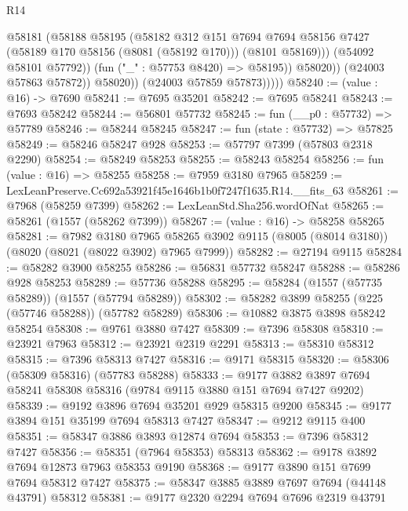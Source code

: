 \begin{lexlean}{R14}
\begin{coremodule}
                        @58181
                          (@58188
                            @58195
                            (@58182
                              @312
                              @151
                              @7694
                              @7694
                              @58156
                              @7427
                              (@58189 @170 @58156 (@8081 (@58192 @170)))
                              (@8101 @58169)))
                          (@54092 @58101 @57792))
                        (fun ("_" : @57753 @8420) => @58195))
                      @58020))
                  (@24003 @57863 @57872))
                @58020))
            (@24003 @57859 @57873)))))
@58240 := (value : @16) -> @7690
@58241 := @7695 @35201
@58242 := @7695 @58241
@58243 := @7693 @58242
@58244 := @56801 @57732
@58245 := fun (__p0 : @57732) => @57789
@58246 := @58244 @58245
@58247 := fun (state : @57732) => @57825
@58249 := @58246 @58247 @928
@58253 := @57797 @7399 (@57803 @2318 @2290)
@58254 := @58249 @58253
@58255 := @58243 @58254
@58256 := fun (value : @16) => @58255
@58258 := @7959 @3180 @7965
@58259 := LexLeanPreserve.Cc692a53921f45e1646b1b0f7247f1635.R14.__fits_63
@58261 := @7968 (@58259 @7399)
@58262 := LexLeanStd.Sha256.wordOfNat
@58265 := @58261 (@1557 (@58262 @7399))
@58267 := (value : @16) -> @58258 @58265
@58281 := @7982
    @3180
    @7965
    @58265
    @3902
    @9115
    (@8005 (@8014 @3180))
    (@8020 (@8021 (@8022 @3902) @7965 @7999))
@58282 := @27194 @9115
@58284 := @58282 @3900 @58255
@58286 := @56831 @57732 @58247
@58288 := @58286 @928 @58253
@58289 := @57736 @58288
@58295 := @58284 (@1557 (@57735 @58289)) (@1557 (@57794 @58289))
@58302 := @58282 @3899 @58255 (@225 (@57746 @58288)) (@57782 @58289)
@58306 := @10882 @3875 @3898 @58242 @58254
@58308 := @9761 @3880 @7427
@58309 := @7396 @58308
@58310 := @23921 @7963
@58312 := @23921 @2319 @2291
@58313 := @58310 @58312
@58315 := @7396 @58313 @7427
@58316 := @9171 @58315
@58320 := @58306 (@58309 @58316) (@57783 @58288)
@58333 := @9177 @3882 @3897 @7694 @58241 @58308 @58316 (@9784 @9115 @3880 @151 @7694 @7427 @9202)
@58339 := @9192 @3896 @7694 @35201 @929 @58315 @9200
@58345 := @9177 @3894 @151 @35199 @7694 @58313 @7427
@58347 := @9212 @9115 @400
@58351 := @58347 @3886 @3893 @12874 @7694
@58353 := @7396 @58312 @7427
@58356 := @58351 (@7964 @58353) @58313
@58362 := @9178 @3892 @7694 @12873 @7963 @58353 @9190
@58368 := @9177 @3890 @151 @7699 @7694 @58312 @7427
@58375 := @58347 @3885 @3889 @7697 @7694 (@44148 @43791) @58312
@58381 := @9177 @2320 @2294 @7694 @7696 @2319 @43791

\end{coremodule}
\end{lexlean}
